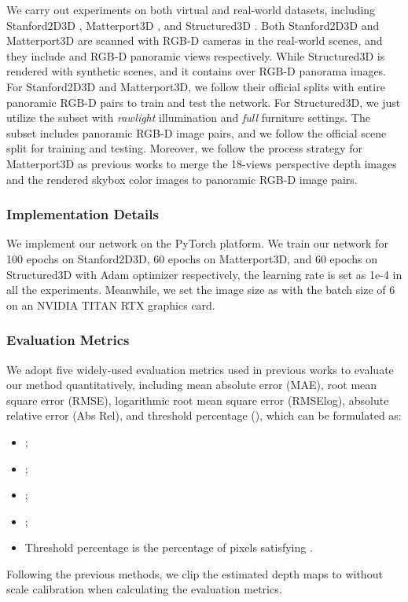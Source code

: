 \documentclass[letterpaper]{article} \usepackage{aaai21}  \usepackage{times}  \usepackage{helvet} \usepackage{courier}  \usepackage[hyphens]{url}  \usepackage{graphicx} \urlstyle{rm} \def\UrlFont{\rm}  \usepackage{natbib}  \usepackage{caption} \frenchspacing  \setlength{\pdfpagewidth}{8.5in}  \setlength{\pdfpageheight}{11in}
\begin{document}
We carry out experiments on both virtual and real-world datasets, including Stanford2D3D \cite{DBLP:journals/corr/ArmeniSZS17}, Matterport3D \cite{DBLP:conf/3dim/ChangDFHNSSZZ17}, and Structured3D \cite{DBLP:conf/eccv/ZhengZLTGZ20}. Both Stanford2D3D and Matterport3D are scanned with RGB-D cameras in the real-world scenes, and they include  and  RGB-D panoramic views respectively. While Structured3D is rendered with synthetic scenes, and it contains over  RGB-D panorama images. 
For Stanford2D3D and Matterport3D, we follow their official splits with entire panoramic RGB-D pairs to train and test the network. For Structured3D, we just utilize the subset with \textit{rawlight} illumination and \textit{full} furniture settings. The subset includes  panoramic RGB-D image pairs, and we follow the official scene split for training and testing. 
Moreover, we follow the process strategy for Matterport3D as previous works to merge the 18-views perspective depth images and the rendered skybox color images to panoramic RGB-D image pairs.

\subsubsection{Implementation Details}
We implement our network on the PyTorch \cite{DBLP:conf/nips/PaszkeGMLBCKLGA19} platform. We train our network for 100 epochs on Stanford2D3D, 60 epochs on Matterport3D, and 60 epochs on Structured3D with Adam \cite{DBLP:journals/corr/KingmaB14} optimizer respectively, the learning rate is set as 1e-4 in all the experiments. 
Meanwhile, we set the image size as  with the batch size of 6 on an NVIDIA TITAN RTX graphics card.

\subsubsection{Evaluation Metrics}
We adopt five widely-used evaluation metrics used in previous works to evaluate our method quantitatively, including mean absolute error (MAE), root mean square error (RMSE), logarithmic root mean square error (RMSElog), absolute relative error (Abs Rel), and threshold percentage (), which can be formulated as:
\begin{itemize}
    \item[\textbf{}] ;
    \item[\textbf{}] ;
    \item[\textbf{}] ;
    \item[\textbf{}] ;
    \item[\textbf{}] Threshold percentage  is the percentage of pixels satisfying .
\end{itemize}
Following the previous methods, we clip the estimated depth maps to  without scale calibration when calculating the evaluation metrics.
\end{document}
